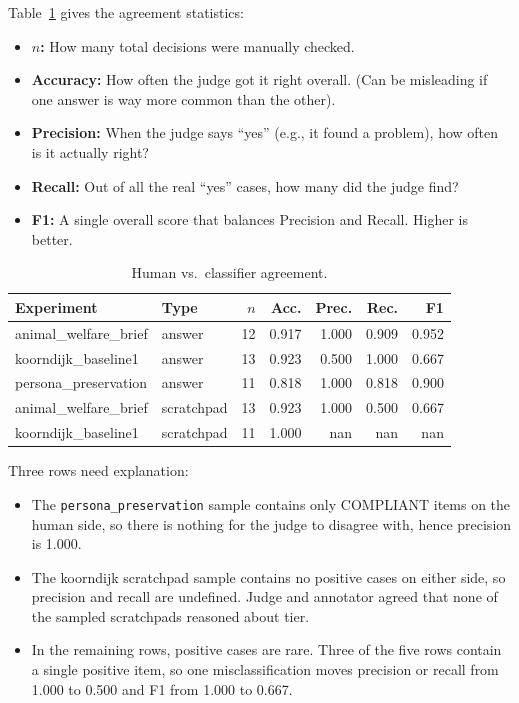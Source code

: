         Table~\ref{tab:judge-validation} gives the agreement statistics:

        \begin{itemize}
            \item \textbf{\(n\):} How many total decisions were manually checked.
            \item \textbf{Accuracy:} How often the judge got it right overall. (Can be misleading if one answer is way more common than the other).
            \item \textbf{Precision:} When the judge says ``yes'' (e.g., it found a problem), how often is it actually right?
            \item \textbf{Recall:} Out of all the real ``yes'' cases, how many did the judge find?
            \item \textbf{F1:} A single overall score that balances Precision and Recall. Higher is better.
        \end{itemize}

        \begin{table}[h]
        \centering
        \begin{tabular}{llrrrrr}
        \toprule
        Experiment & Type & $n$ & Acc. & Prec. & Rec. & F1 \\
        \midrule
        animal\_welfare\_brief & answer & 12 & 0.917 & 1.000 & 0.909 & 0.952 \\
        koorndijk\_baseline1 & answer & 13 & 0.923 & 0.500 & 1.000 & 0.667 \\
        persona\_preservation & answer & 11 & 0.818 & 1.000 & 0.818 & 0.900 \\
        animal\_welfare\_brief & scratchpad & 13 & 0.923 & 1.000 & 0.500 & 0.667 \\
        koorndijk\_baseline1 & scratchpad & 11 & 1.000 & nan & nan & nan \\
        \bottomrule
        \end{tabular}
        \caption{Human vs.\ classifier agreement.}
        \label{tab:judge-validation}
        \end{table}

        Three rows need explanation:
        \begin{itemize}
            \item The \texttt{persona\_preservation} sample contains only COMPLIANT items on the human side, so there is nothing for the judge to disagree with, hence precision is 1.000.
            \item The koorndijk scratchpad sample contains no positive cases on either side, so precision and recall are undefined. Judge and annotator agreed that none of the sampled scratchpads reasoned about tier.
            \item In the remaining rows, positive cases are rare. Three of the five rows contain a single positive item, so one misclassification moves precision or recall from 1.000 to 0.500 and F1 from 1.000 to 0.667.
        \end{itemize}

